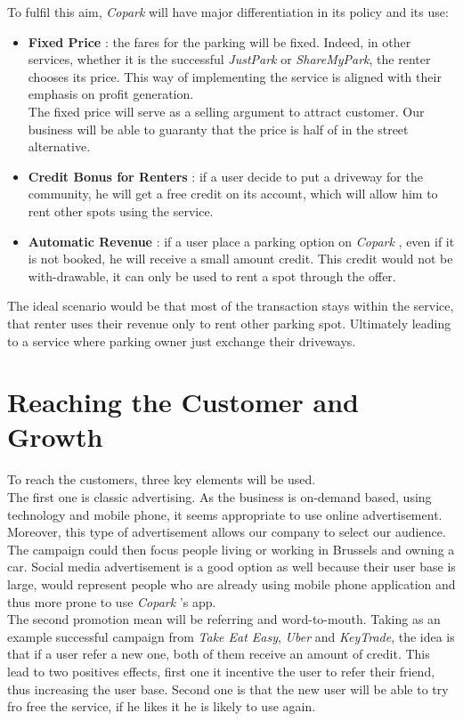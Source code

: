\documentclass[12pt,a4paper,oneside]{book}
\newcommand{\bp}{\textit{Copark }}
\begin{document}
To fulfil this aim, \bp will have major differentiation in its policy and its use:
\begin{itemize}
\item \textbf{Fixed Price} : the fares for the parking will be fixed. Indeed, in other services, whether it is  the successful \textit{JustPark} or \textit{ShareMyPark}, the renter chooses its price. This way of implementing the service is aligned with their emphasis on profit generation.\\
The fixed price will serve as a selling argument to attract customer. Our business will be able to guaranty that the price is half of in the street alternative.
\item \textbf{Credit Bonus for Renters} : if a user decide to put a driveway for the community, he will get a free credit on its account, which will allow him to rent other spots using the service.
\item \textbf{Automatic Revenue} : if a user place a parking option on \bp, even if it is not booked, he will receive a small amount credit. This credit would not be with-drawable, it can only be used to rent a spot through the offer.
\end{itemize}

The ideal scenario would be that most of the transaction stays within the service, that renter uses their revenue only to rent other parking spot. Ultimately leading to a service where parking owner just exchange their driveways.

\section{Reaching the Customer and Growth}
To reach the customers, three key elements will be used.\\

The first one is classic advertising. As the business is on-demand based, using technology and mobile phone, it seems appropriate to use online advertisement. Moreover, this type of advertisement allows our company to select our audience. The campaign could then focus people living or working in Brussels and owning a car. Social media advertisement is a good option as well because their user base is large, would represent people who are already using mobile phone application and thus more prone to use \bp's app.\\

The second promotion mean will be referring and word-to-mouth. Taking as an example successful campaign from \textit{Take Eat Easy}, \textit{Uber} and \textit{KeyTrade}, the idea is that if a user refer a new one, both of them receive an amount of credit. This lead to two positives effects, first one it incentive the user to refer their friend, thus increasing the user base. Second one is that the new user will be able to try fro free the service, if he likes it he is likely to use again.\\
\end{document}
